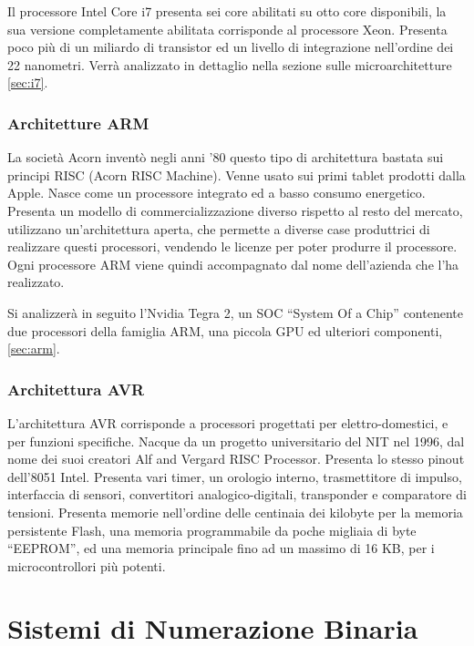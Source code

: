 \documentclass{article}
\numberwithin{equation}{subsection}
\begin{document}
Il processore Intel Core i7 presenta sei core abilitati su otto core disponibili, la sua versione completamente abilitata corrisponde al processore Xeon. Presenta poco più di 
un miliardo di transistor ed un livello di integrazione nell'ordine dei 22 nanometri. Verrà analizzato in dettaglio nella sezione sulle microarchitetture \ref{sec:i7}. 

\subsubsection{Architetture ARM}

La società Acorn inventò negli anni '80 questo tipo di architettura bastata sui principi RISC (Acorn RISC Machine). Venne usato sui primi tablet prodotti dalla Apple. Nasce come 
un processore integrato ed a basso consumo energetico. Presenta un modello di commercializzazione diverso rispetto al resto del mercato, utilizzano un'architettura aperta, che 
permette a diverse case produttrici di realizzare questi processori, vendendo le licenze per poter produrre il processore. Ogni processore ARM viene quindi accompagnato dal nome 
dell'azienda che l'ha realizzato. 

Si analizzerà in seguito l'Nvidia Tegra 2, un SOC ``System Of a Chip'' contenente due processori della famiglia ARM, una piccola GPU ed ulteriori componenti, \ref{sec:arm}. 

\subsubsection{Architettura AVR}

L'architettura AVR corrisponde a processori progettati per elettro-domestici, e per funzioni specifiche. Nacque da un progetto universitario del NIT nel 1996, dal nome dei 
suoi creatori Alf and Vergard RISC Processor. Presenta lo stesso pinout dell'8051 Intel. Presenta vari timer, un orologio interno, trasmettitore di impulso, interfaccia 
di sensori, convertitori analogico-digitali, transponder e comparatore di tensioni. Presenta memorie nell'ordine delle centinaia dei kilobyte per la memoria persistente Flash, 
una memoria programmabile da poche migliaia di byte ``EEPROM'', ed una memoria principale fino ad un massimo di 16 KB, per i microcontrollori più potenti. 

\clearpage

\section{Sistemi di Numerazione Binaria}
\end{document}
